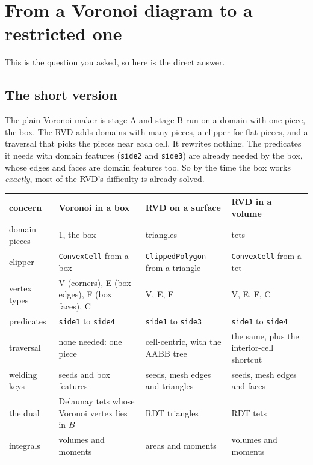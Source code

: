 \documentclass[11pt,a4paper]{article}
\newcommand{\code}[1]{\texttt{#1}}          %
\begin{document}
\section{From a Voronoi diagram to a restricted one}\label{sec:generalisation}

This is the question you asked, so here is the direct answer.

\subsection{The short version}\label{ssec:short}

The plain Voronoi maker is stage A and stage B run on a domain with one piece, the box. The RVD
adds domains with many pieces, a clipper for flat pieces, and a traversal that picks the pieces
near each cell. It rewrites nothing. The predicates it needs with domain features (\code{side2}
and \code{side3}) are already needed by the box, whose edges and faces are domain features too.
So by the time the box works \emph{exactly}, most of the RVD's difficulty is already solved.

{\small
\begin{xltabular}{\linewidth}{@{}P{2.3cm} L L L@{}}
\toprule
concern & Voronoi in a box & RVD on a surface & RVD in a volume \\
\midrule
\endhead
domain pieces & 1, the box & triangles & tets \\
clipper & \code{ConvexCell} from a box & \code{ClippedPolygon} from a triangle
  & \code{ConvexCell} from a tet \\
vertex types & V (corners), E (box edges), F (box faces), C & V, E, F & V, E, F, C \\
predicates & \code{side1} to \code{side4} & \code{side1} to \code{side3}
  & \code{side1} to \code{side4} \\
traversal & none needed: one piece & cell-centric, with the AABB tree
  & the same, plus the interior-cell shortcut \\
welding keys & seeds and box features & seeds, mesh edges and triangles
  & seeds, mesh edges and faces \\
the dual & Delaunay tets whose Voronoi vertex lies in $B$ & RDT triangles & RDT tets \\
integrals & volumes and moments & areas and moments & volumes and moments \\
\bottomrule
\end{xltabular}}
\end{document}
